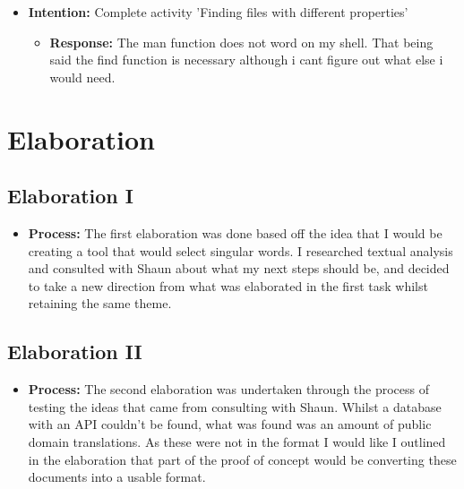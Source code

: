 \documentclass{article}
\begin{document}
\begin{itemize}
\begin{itemize}
\end{itemize}

\item{\textbf{Intention:} Complete activity 'Finding files with different properties'}

\begin{itemize}
\item{\textbf{Response:} The man function does not word on my shell. That being said the find function is necessary although i cant figure out what else i would need.}


\end{itemize}
\end{itemize}

\vspace{5mm}
\section{Elaboration}
\subsection{Elaboration I}
\date{29/08/2019 14:00}
\begin{itemize}
\item{\textbf{Process:} The first elaboration was done based off the idea that I would be creating a tool that would select singular words. I researched textual analysis and consulted with Shaun about what my next steps should be, and decided to take a new direction from what was elaborated in the first task whilst retaining the same theme.}

\end{itemize}

\subsection{Elaboration II}

\date{05/09/2019 13:00}

\begin{itemize}
\item{\textbf{Process:} The second elaboration was undertaken through the process of testing the ideas that came from consulting with Shaun. Whilst a database with an API couldn't be found, what was found was an amount of public domain translations. As these were not in the format I would like I outlined in the elaboration that part of the proof of concept would be converting these documents into a usable format.}


\end{itemize}
\vspace{5mm}
\end{document}
